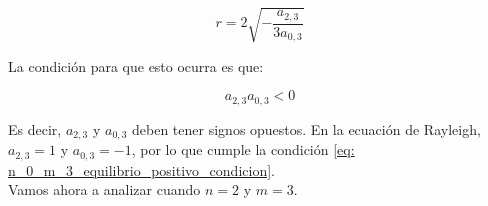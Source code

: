 \begin{equation}\label{eq: n_0_m_3_equilibrio_positivo}
	r=2\sqrt{-\frac{a_{2,3}}{3a_{0,3}}}
\end{equation}

La condición para que esto ocurra es que:

\begin{equation}\label{eq: n_0_m_3_equilibrio_positivo_condicion}
	a_{2,3}a_{0,3}<0
\end{equation}

Es decir, $a_{2,3}$ y $a_{0,3}$ deben tener signos opuestos. En la ecuación de Rayleigh, $a_{2,3}=1$ y $a_{0,3}=-1$, por lo que cumple la condición \eqref{eq: n_0_m_3_equilibrio_positivo_condicion}.\\

Vamos ahora a analizar cuando $n=2$ y $m=3$.









